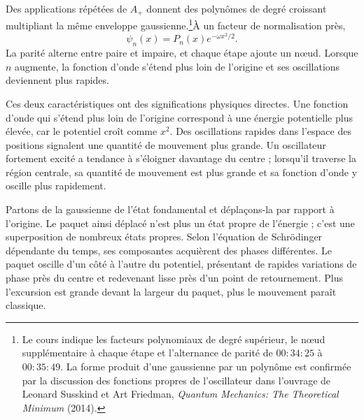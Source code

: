 Des applications répétées de \(A_{+}\) donnent des polynômes de degré croissant multipliant la même enveloppe gaussienne.\footnote{Le cours indique les facteurs polynomiaux de degré supérieur, le nœud supplémentaire à chaque étape et l’alternance de parité de \(00{:}34{:}25\) à \(00{:}35{:}49\). La forme produit d’une gaussienne par un polynôme est confirmée par la discussion des fonctions propres de l’oscillateur dans l’ouvrage de Leonard Susskind et Art Friedman, \emph{Quantum Mechanics: The Theoretical Minimum} (2014).}À un facteur de normalisation près,
\begin{equation}
\psi_{n}(x)=P_{n}(x)e^{-\omega x^{2}/2}.
\end{equation}
La parité alterne entre paire et impaire, et chaque étape ajoute un nœud. Lorsque \(n\) augmente, la fonction d’onde s’étend plus loin de l’origine et ses oscillations deviennent plus rapides.

Ces deux caractéristiques ont des significations physiques directes. Une fonction d’onde qui s’étend plus loin de l’origine correspond à une énergie potentielle plus élevée, car le potentiel croît comme \(x^{2}\). Des oscillations rapides dans l’espace des positions signalent une quantité de mouvement plus grande. Un oscillateur fortement excité a tendance à s’éloigner davantage du centre ; lorsqu’il traverse la région centrale, sa quantité de mouvement est plus grande et sa fonction d’onde y oscille plus rapidement.

\begin{classroomqa}
\end{classroomqa}

Partons de la gaussienne de l’état fondamental et déplaçons-la par rapport à l’origine. Le paquet ainsi déplacé n’est plus un état propre de l’énergie ; c’est une superposition de nombreux états propres. Selon l’équation de Schr\"odinger dépendante du temps, ses composantes acquièrent des phases différentes. Le paquet oscille d’un côté à l’autre du potentiel, présentant de rapides variations de phase près du centre et redevenant lisse près d’un point de retournement. Plus l’excursion est grande devant la largeur du paquet, plus le mouvement paraît classique.

